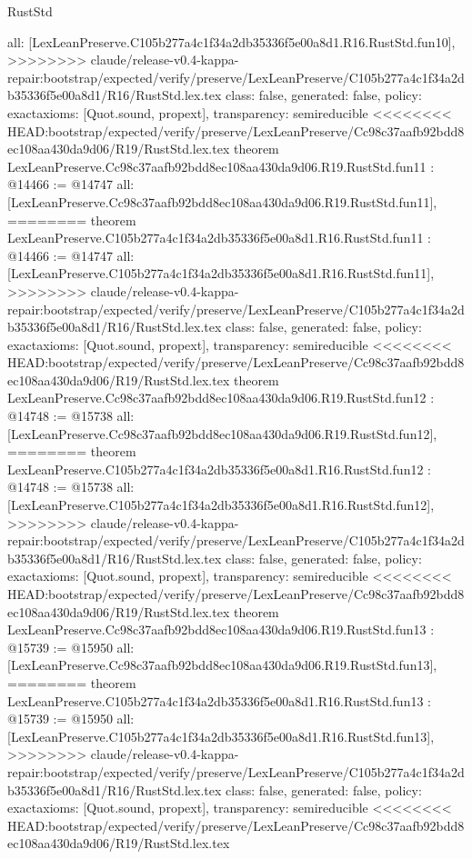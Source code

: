 \begin{lexlean}{RustStd}
\begin{coremodule}
{\begin{coremodule}
{{{{{{{{{{{{{{  all: [LexLeanPreserve.C105b277a4c1f34a2db35336f5e00a8d1.R16.RustStd.fun10],
>>>>>>>> claude/release-v0.4-kappa-repair:bootstrap/expected/verify/preserve/LexLeanPreserve/C105b277a4c1f34a2db35336f5e00a8d1/R16/RustStd.lex.tex
  class: false,
  generated: false,
  policy: exact{axioms: [Quot.sound, propext]},
  transparency: semireducible
}
<<<<<<<< HEAD:bootstrap/expected/verify/preserve/LexLeanPreserve/Cc98c37aafb92bdd8ec108aa430da9d06/R19/RustStd.lex.tex
theorem LexLeanPreserve.Cc98c37aafb92bdd8ec108aa430da9d06.R19.RustStd.fun11 : @14466 := @14747 {
  all: [LexLeanPreserve.Cc98c37aafb92bdd8ec108aa430da9d06.R19.RustStd.fun11],
========
theorem LexLeanPreserve.C105b277a4c1f34a2db35336f5e00a8d1.R16.RustStd.fun11 : @14466 := @14747 {
  all: [LexLeanPreserve.C105b277a4c1f34a2db35336f5e00a8d1.R16.RustStd.fun11],
>>>>>>>> claude/release-v0.4-kappa-repair:bootstrap/expected/verify/preserve/LexLeanPreserve/C105b277a4c1f34a2db35336f5e00a8d1/R16/RustStd.lex.tex
  class: false,
  generated: false,
  policy: exact{axioms: [Quot.sound, propext]},
  transparency: semireducible
}
<<<<<<<< HEAD:bootstrap/expected/verify/preserve/LexLeanPreserve/Cc98c37aafb92bdd8ec108aa430da9d06/R19/RustStd.lex.tex
theorem LexLeanPreserve.Cc98c37aafb92bdd8ec108aa430da9d06.R19.RustStd.fun12 : @14748 := @15738 {
  all: [LexLeanPreserve.Cc98c37aafb92bdd8ec108aa430da9d06.R19.RustStd.fun12],
========
theorem LexLeanPreserve.C105b277a4c1f34a2db35336f5e00a8d1.R16.RustStd.fun12 : @14748 := @15738 {
  all: [LexLeanPreserve.C105b277a4c1f34a2db35336f5e00a8d1.R16.RustStd.fun12],
>>>>>>>> claude/release-v0.4-kappa-repair:bootstrap/expected/verify/preserve/LexLeanPreserve/C105b277a4c1f34a2db35336f5e00a8d1/R16/RustStd.lex.tex
  class: false,
  generated: false,
  policy: exact{axioms: [Quot.sound, propext]},
  transparency: semireducible
}
<<<<<<<< HEAD:bootstrap/expected/verify/preserve/LexLeanPreserve/Cc98c37aafb92bdd8ec108aa430da9d06/R19/RustStd.lex.tex
theorem LexLeanPreserve.Cc98c37aafb92bdd8ec108aa430da9d06.R19.RustStd.fun13 : @15739 := @15950 {
  all: [LexLeanPreserve.Cc98c37aafb92bdd8ec108aa430da9d06.R19.RustStd.fun13],
========
theorem LexLeanPreserve.C105b277a4c1f34a2db35336f5e00a8d1.R16.RustStd.fun13 : @15739 := @15950 {
  all: [LexLeanPreserve.C105b277a4c1f34a2db35336f5e00a8d1.R16.RustStd.fun13],
>>>>>>>> claude/release-v0.4-kappa-repair:bootstrap/expected/verify/preserve/LexLeanPreserve/C105b277a4c1f34a2db35336f5e00a8d1/R16/RustStd.lex.tex
  class: false,
  generated: false,
  policy: exact{axioms: [Quot.sound, propext]},
  transparency: semireducible
}
<<<<<<<< HEAD:bootstrap/expected/verify/preserve/LexLeanPreserve/Cc98c37aafb92bdd8ec108aa430da9d06/R19/RustStd.lex.tex
}}}}}}}}}}}}}}}}
\end{coremodule}}
\end{coremodule}
\end{lexlean}
